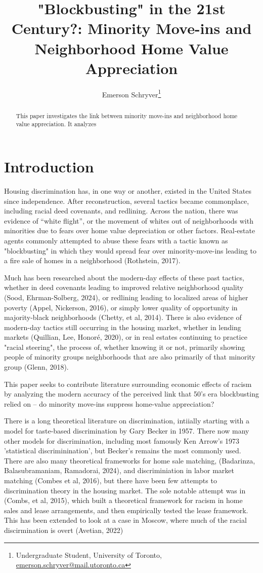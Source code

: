 \documentclass{article}
\title{"Blockbusting" in the 21st Century?: Minority Move-ins and Neighborhood Home Value Appreciation}
\author{Emerson Schryver\thanks{Undergraduate Student, University of Toronto, \href{mailto:emerson.schryver@mail.utoronto.ca}{emerson.schryver@mail.utoronto.ca}}}
\begin{document}
\maketitle
\begin{abstract}
    This paper investigates the link between minority move-ins and neighborhood home value appreciation. It analyzes

\end{abstract}
\newpage
\section{Introduction}
\indent Housing discrimination has, in one way or another, existed in the United States since independence. After reconstruction, several tactics became commonplace, including racial deed covenants, and redlining. Across the nation, there was evidence of ``white flight'', or the movement of whites out of neighborhoods with minorities due to fears over home value depreciation or other factors. Real-estate agents commonly attempted to abuse these fears with a tactic known as "blockbusting" in which they would spread fear over minority-move-ins leading to a fire sale of homes in a neighborhood (Rothstein, 2017).

Much has been researched about the modern-day effects of these past tactics, whether in deed covenants leading to improved relative neighborhood quality (Sood, Ehrman-Solberg, 2024), or redlining leading to localized areas of higher poverty (Appel, Nickerson, 2016), or simply lower quality of opportunity in majority-black neighborhoods (Chetty, et al, 2014). There is also evidence of modern-day tactics still occurring in the housing market, whether in lending markets (Quillian, Lee, Honoré, 2020), or in real estates continuing to practice "racial steering", the process of, whether knowing it or not, primarily showing people of minority groups neighborhoods that are also primarily of that minority group (Glenn, 2018). 

This paper seeks to contribute literature surrounding economic effects of racism  by analyzing the modern accuracy of the perceived link that 50's era blockbusting relied on -- do minority move-ins suppress home-value appreciation?

There is a long theoretical literature on discrimination, intiially starting with a model for taste-based discrimination by Gary Becker in 1957. There now many other models for discrimination, including most famously Ken Arrow's 1973 'statistical discriminination', but Becker's remains the most commonly used. There are also many theoretical frameworks for home sale matching, (Badarinza, Balasubramaniam, Ramadorai, 2024), and discriminiation in labor market matching (Combes et al, 2016), but there have been few attempts to discrimination theory in the housing market. The sole notable attempt was in (Combs, et al, 2015), which built a theoretical framework for racism in home sales and lease arrangements, and then empirically tested the lease framework. This has been extended to look at a case in Moscow, where much of the racial discirmination is overt (Avetian, 2022)
\end{document}
